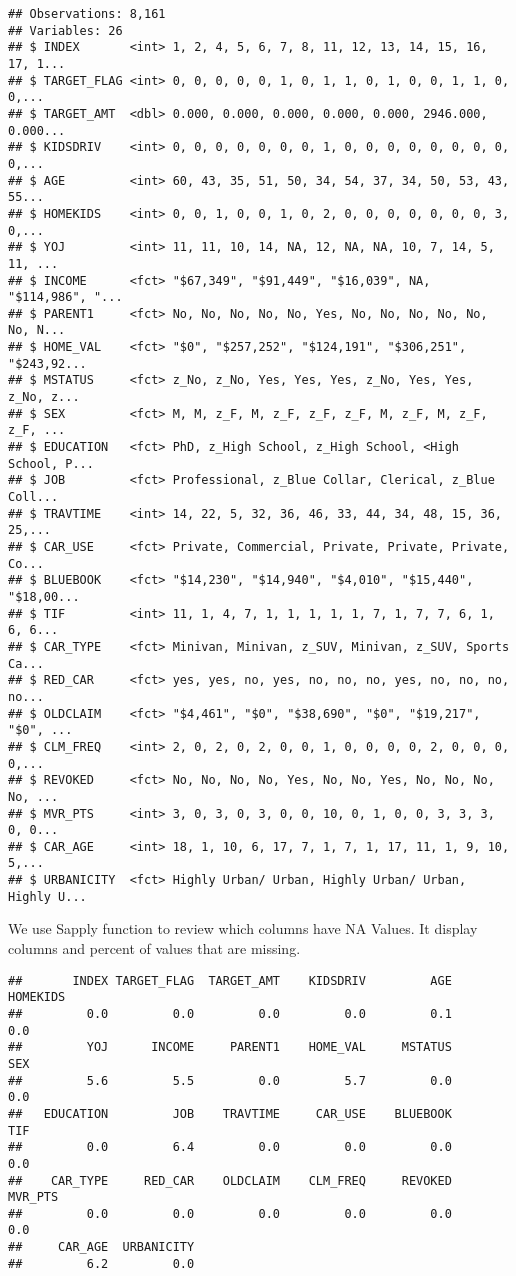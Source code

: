 \documentclass[]{article}
\begin{document}
\begin{verbatim}
## Observations: 8,161
## Variables: 26
## $ INDEX       <int> 1, 2, 4, 5, 6, 7, 8, 11, 12, 13, 14, 15, 16, 17, 1...
## $ TARGET_FLAG <int> 0, 0, 0, 0, 0, 1, 0, 1, 1, 0, 1, 0, 0, 1, 1, 0, 0,...
## $ TARGET_AMT  <dbl> 0.000, 0.000, 0.000, 0.000, 0.000, 2946.000, 0.000...
## $ KIDSDRIV    <int> 0, 0, 0, 0, 0, 0, 0, 1, 0, 0, 0, 0, 0, 0, 0, 0, 0,...
## $ AGE         <int> 60, 43, 35, 51, 50, 34, 54, 37, 34, 50, 53, 43, 55...
## $ HOMEKIDS    <int> 0, 0, 1, 0, 0, 1, 0, 2, 0, 0, 0, 0, 0, 0, 0, 3, 0,...
## $ YOJ         <int> 11, 11, 10, 14, NA, 12, NA, NA, 10, 7, 14, 5, 11, ...
## $ INCOME      <fct> "$67,349", "$91,449", "$16,039", NA, "$114,986", "...
## $ PARENT1     <fct> No, No, No, No, No, Yes, No, No, No, No, No, No, N...
## $ HOME_VAL    <fct> "$0", "$257,252", "$124,191", "$306,251", "$243,92...
## $ MSTATUS     <fct> z_No, z_No, Yes, Yes, Yes, z_No, Yes, Yes, z_No, z...
## $ SEX         <fct> M, M, z_F, M, z_F, z_F, z_F, M, z_F, M, z_F, z_F, ...
## $ EDUCATION   <fct> PhD, z_High School, z_High School, <High School, P...
## $ JOB         <fct> Professional, z_Blue Collar, Clerical, z_Blue Coll...
## $ TRAVTIME    <int> 14, 22, 5, 32, 36, 46, 33, 44, 34, 48, 15, 36, 25,...
## $ CAR_USE     <fct> Private, Commercial, Private, Private, Private, Co...
## $ BLUEBOOK    <fct> "$14,230", "$14,940", "$4,010", "$15,440", "$18,00...
## $ TIF         <int> 11, 1, 4, 7, 1, 1, 1, 1, 1, 7, 1, 7, 7, 6, 1, 6, 6...
## $ CAR_TYPE    <fct> Minivan, Minivan, z_SUV, Minivan, z_SUV, Sports Ca...
## $ RED_CAR     <fct> yes, yes, no, yes, no, no, no, yes, no, no, no, no...
## $ OLDCLAIM    <fct> "$4,461", "$0", "$38,690", "$0", "$19,217", "$0", ...
## $ CLM_FREQ    <int> 2, 0, 2, 0, 2, 0, 0, 1, 0, 0, 0, 0, 2, 0, 0, 0, 0,...
## $ REVOKED     <fct> No, No, No, No, Yes, No, No, Yes, No, No, No, No, ...
## $ MVR_PTS     <int> 3, 0, 3, 0, 3, 0, 0, 10, 0, 1, 0, 0, 3, 3, 3, 0, 0...
## $ CAR_AGE     <int> 18, 1, 10, 6, 17, 7, 1, 7, 1, 17, 11, 1, 9, 10, 5,...
## $ URBANICITY  <fct> Highly Urban/ Urban, Highly Urban/ Urban, Highly U...
\end{verbatim}

We use Sapply function to review which columns have NA Values. It
display columns and percent of values that are missing.

\begin{verbatim}
##       INDEX TARGET_FLAG  TARGET_AMT    KIDSDRIV         AGE    HOMEKIDS 
##         0.0         0.0         0.0         0.0         0.1         0.0 
##         YOJ      INCOME     PARENT1    HOME_VAL     MSTATUS         SEX 
##         5.6         5.5         0.0         5.7         0.0         0.0 
##   EDUCATION         JOB    TRAVTIME     CAR_USE    BLUEBOOK         TIF 
##         0.0         6.4         0.0         0.0         0.0         0.0 
##    CAR_TYPE     RED_CAR    OLDCLAIM    CLM_FREQ     REVOKED     MVR_PTS 
##         0.0         0.0         0.0         0.0         0.0         0.0 
##     CAR_AGE  URBANICITY 
##         6.2         0.0
\end{verbatim}
\end{document}
